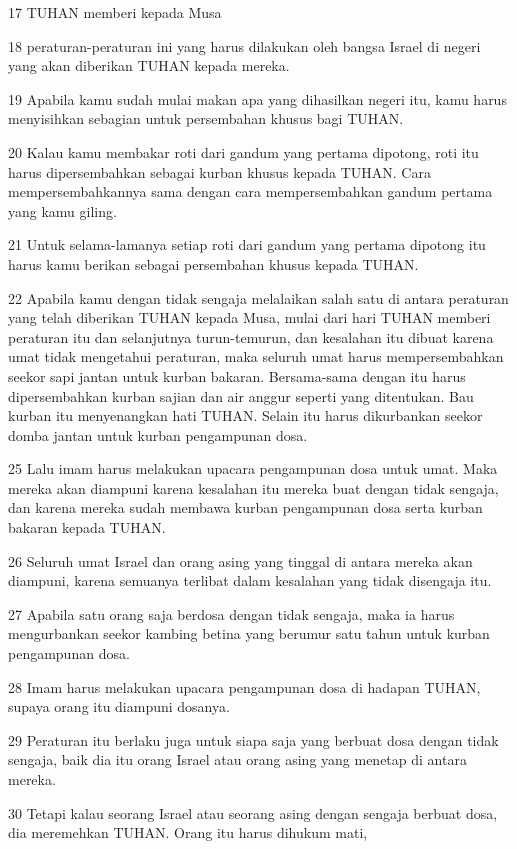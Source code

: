 \par 17 TUHAN memberi kepada Musa
\par 18 peraturan-peraturan ini yang harus dilakukan oleh bangsa Israel di negeri yang akan diberikan TUHAN kepada mereka.
\par 19 Apabila kamu sudah mulai makan apa yang dihasilkan negeri itu, kamu harus menyisihkan sebagian untuk persembahan khusus bagi TUHAN.
\par 20 Kalau kamu membakar roti dari gandum yang pertama dipotong, roti itu harus dipersembahkan sebagai kurban khusus kepada TUHAN. Cara mempersembahkannya sama dengan cara mempersembahkan gandum pertama yang kamu giling.
\par 21 Untuk selama-lamanya setiap roti dari gandum yang pertama dipotong itu harus kamu berikan sebagai persembahan khusus kepada TUHAN.
\par 22 Apabila kamu dengan tidak sengaja melalaikan salah satu di antara peraturan yang telah diberikan TUHAN kepada Musa, mulai dari hari TUHAN memberi peraturan itu dan selanjutnya turun-temurun, dan kesalahan itu dibuat karena umat tidak mengetahui peraturan, maka seluruh umat harus mempersembahkan seekor sapi jantan untuk kurban bakaran. Bersama-sama dengan itu harus dipersembahkan kurban sajian dan air anggur seperti yang ditentukan. Bau kurban itu menyenangkan hati TUHAN. Selain itu harus dikurbankan seekor domba jantan untuk kurban pengampunan dosa.
\par 25 Lalu imam harus melakukan upacara pengampunan dosa untuk umat. Maka mereka akan diampuni karena kesalahan itu mereka buat dengan tidak sengaja, dan karena mereka sudah membawa kurban pengampunan dosa serta kurban bakaran kepada TUHAN.
\par 26 Seluruh umat Israel dan orang asing yang tinggal di antara mereka akan diampuni, karena semuanya terlibat dalam kesalahan yang tidak disengaja itu.
\par 27 Apabila satu orang saja berdosa dengan tidak sengaja, maka ia harus mengurbankan seekor kambing betina yang berumur satu tahun untuk kurban pengampunan dosa.
\par 28 Imam harus melakukan upacara pengampunan dosa di hadapan TUHAN, supaya orang itu diampuni dosanya.
\par 29 Peraturan itu berlaku juga untuk siapa saja yang berbuat dosa dengan tidak sengaja, baik dia itu orang Israel atau orang asing yang menetap di antara mereka.
\par 30 Tetapi kalau seorang Israel atau seorang asing dengan sengaja berbuat dosa, dia meremehkan TUHAN. Orang itu harus dihukum mati,
